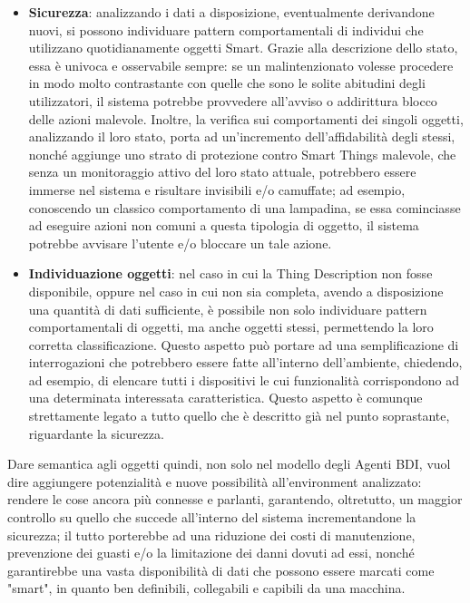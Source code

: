 \documentclass[12pt,a4paper,openright,oneside]{report}
\begin{document}
\begin{itemize}
	\item \textbf{Sicurezza}: analizzando i dati a disposizione, eventualmente derivandone nuovi, si possono individuare pattern comportamentali di individui che utilizzano quotidianamente oggetti Smart. Grazie alla descrizione dello stato, essa è univoca e osservabile sempre: se un malintenzionato volesse procedere in modo molto contrastante con quelle che sono le solite abitudini degli utilizzatori, il sistema potrebbe provvedere all'avviso o addirittura blocco delle azioni malevole. Inoltre, la verifica sui comportamenti dei singoli oggetti, analizzando il loro stato, porta ad un'incremento dell'affidabilità degli stessi, nonché aggiunge uno strato di protezione contro Smart Things malevole, che senza un monitoraggio attivo del loro stato attuale, potrebbero essere immerse nel sistema e risultare invisibili e/o camuffate; ad esempio, conoscendo un classico comportamento di una lampadina, se essa cominciasse ad eseguire azioni non comuni a questa tipologia di oggetto, il sistema potrebbe avvisare l'utente e/o bloccare un tale azione.
	
	\item \textbf{Individuazione oggetti}: nel caso in cui la Thing Description non fosse disponibile, oppure nel caso in cui non sia completa, avendo a disposizione una quantità di dati sufficiente, è possibile non solo individuare pattern comportamentali di oggetti, ma anche oggetti stessi, permettendo la loro corretta classificazione. Questo aspetto può portare ad una semplificazione di interrogazioni che potrebbero essere fatte all'interno dell'ambiente, chiedendo, ad esempio, di elencare tutti i dispositivi le cui funzionalità corrispondono ad una determinata interessata caratteristica. Questo aspetto è comunque strettamente legato a tutto quello che è descritto già nel punto soprastante, riguardante la sicurezza.
	
\end{itemize}

Dare semantica agli oggetti quindi, non solo nel modello degli Agenti BDI, vuol dire aggiungere potenzialità e nuove possibilità all'environment analizzato: rendere le cose ancora più connesse e parlanti, garantendo, oltretutto, un maggior controllo su quello che succede all'interno del sistema incrementandone la sicurezza; il tutto porterebbe ad una riduzione dei costi di manutenzione, prevenzione dei guasti e/o la limitazione dei danni dovuti ad essi, nonché garantirebbe una vasta disponibilità di dati che possono essere marcati come "smart", in quanto ben definibili, collegabili e capibili da una macchina.\\
\end{document}
